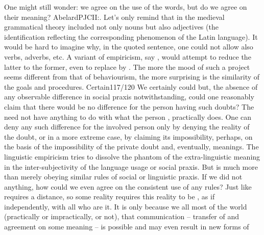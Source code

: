 One might still wonder: we agree on the use of the words, but do we agree on
their meaning?  \citet{With most names, we've come to know which things they go
  together with from their use in speech, although we are unable to determine
  what the correct meaning or understanding of them is.}{AbelardPJC}{II:. Let's only remind that in the medieval grammatical theory 
  included not only nouns but also adjectives (the identification reflecting the
  corresponding phenomenon of the Latin language). It would be hard to imagine
  why, in the quoted sentence, one could not allow also verbs, adverbs,
  etc.\label{ftnt:latinNames}} A variant of empiricism, say , would attempt to reduce the latter to the former, even to replace
 by .  The more the mood of such a project seems different
from that of behaviourism, the more surprising is the similarity of the goals
and procedures.  \citet{Why is it not possible for me to doubt that I have never
  been on the moon? [...]  But if anyone were to doubt it, how would his doubt
  come out in practice?  And couldn't we peacefully leave him to doubt it, since
  it makes no difference at all?}{Certain}{117/120} We certainly could but, the
absence of any observable difference in social praxis notwithstanding, could one
reasonably claim that there would be no difference for the person having such
doubts? The  need not have anything to do with
what the person , practically does.  One can deny any such
difference for the involved person only by denying the reality of the doubt, or
in a more extreme case, by claiming its impossibility, perhaps, on the basis of
the impossibility of the private doubt and, eventually, meanings. The linguistic
empiricism tries to dissolve the phantom of the extra-linguistic meaning in the
inter-subjectivity of the language usage or social praxis.  But  is
much more than merely obeying similar rules of social or linguistic praxis. If
we did not  anything, how could we even agree on the consistent use of
any rules? Just like  requires a distance, so  some
reality requires this reality to be , as if independently, with all
who are  it. It is only because we all
 most of the world (practically or impractically,  or
not), that  communication -- transfer of and agreement on some
meaning -- is possible and may even result in new forms of
